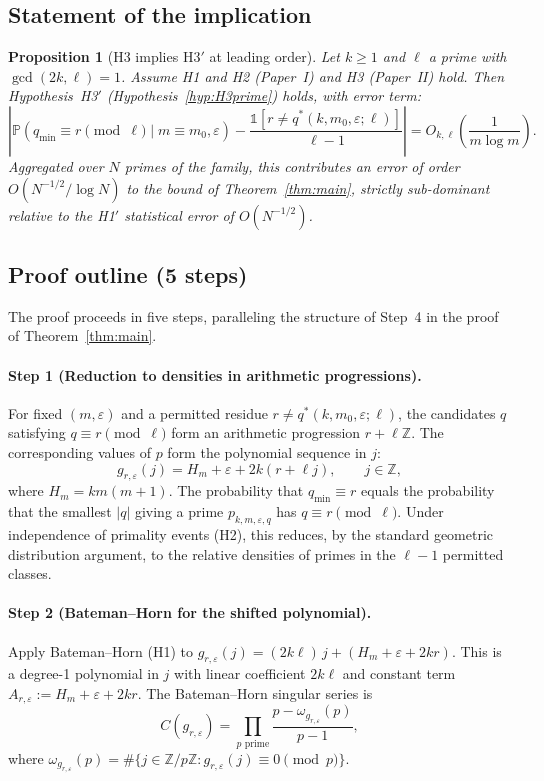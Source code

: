 \documentclass[11pt,a4paper]{article}
\theoremstyle{plain}
\newtheorem{proposition}[theorem]{Proposition}
\theoremstyle{definition}
\newcommand{\qmin}{q_{\min}}
\newcommand{\Z}{\mathbb{Z}}
\newcommand{\Prb}{\mathbb{P}}
\newcommand{\eps}{\varepsilon}
\begin{document}
\subsection{Statement of the implication}

\begin{heuristicbox}
\begin{proposition}[H3 implies H3$'$ at leading order]\label{prop:h3-implies-h3prime}
Let $k \ge 1$ and $\ell$ a prime with $\gcd(2k, \ell) = 1$. Assume H1 and H2
(Paper~I) and H3 (Paper~II) hold. Then Hypothesis~H3$'$
(Hypothesis~\ref{hyp:H3prime}) holds, with error term:
\[
\left| \Prb\!\left(\qmin \equiv r \pmod \ell \mid m \equiv m_0, \eps\right)
- \frac{\mathbb{1}[r \neq q^*(k, m_0, \eps; \ell)]}{\ell - 1} \right|
= O_{k, \ell}\!\left(\frac{1}{m \log m}\right).
\]
Aggregated over $N$ primes of the family, this contributes an error of order
$O(N^{-1/2} / \log N)$ to the bound of Theorem~\ref{thm:main}, strictly
sub-dominant relative to the H1$'$ statistical error of $O(N^{-1/2})$.
\end{proposition}
\end{heuristicbox}

\subsection{Proof outline (5 steps)}

The proof proceeds in five steps, paralleling the structure of Step~4 in the
proof of Theorem~\ref{thm:main}.

\paragraph{Step 1 (Reduction to densities in arithmetic progressions).}
For fixed $(m, \eps)$ and a permitted residue $r \neq q^*(k, m_0, \eps; \ell)$,
the candidates $q$ satisfying $q \equiv r \pmod \ell$ form an arithmetic
progression $r + \ell \Z$. The corresponding values of $p$ form the polynomial
sequence in $j$:
\[
g_{r, \eps}(j) = H_m + \eps + 2k(r + \ell j), \qquad j \in \Z,
\]
where $H_m = km(m+1)$. The probability that $\qmin \equiv r$ equals the
probability that the smallest $|q|$ giving a prime $p_{k,m,\eps,q}$ has
$q \equiv r \pmod \ell$. Under independence of primality events (H2), this
reduces, by the standard geometric distribution argument, to the relative
densities of primes in the $\ell-1$ permitted classes.

\paragraph{Step 2 (Bateman--Horn for the shifted polynomial).}
Apply Bateman--Horn (H1) to $g_{r, \eps}(j) = (2k\ell)\,j + (H_m + \eps + 2kr)$.
This is a degree-1 polynomial in $j$ with linear coefficient $2k\ell$ and
constant term $A_{r, \eps} := H_m + \eps + 2kr$. The Bateman--Horn singular
series is
\[
C(g_{r, \eps}) = \prod_{p \text{ prime}}
\frac{p - \omega_{g_{r,\eps}}(p)}{p - 1},
\]
where $\omega_{g_{r, \eps}}(p) = \#\{j \in \Z/p\Z : g_{r, \eps}(j) \equiv 0 \pmod p\}$.
\end{document}
